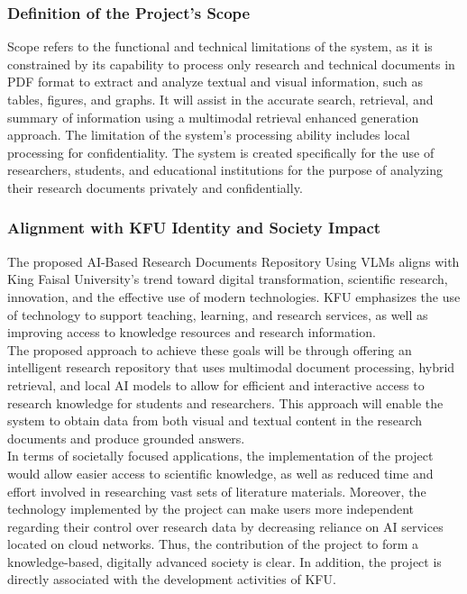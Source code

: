 \documentclass[11pt,a4paper]{report}
\begin{document}
\subsubsection{Definition of the Project's Scope}
Scope refers to the functional and technical limitations of the system, as it is constrained by its capability to process only research and technical documents in PDF format to extract and analyze textual and visual information, such as tables, figures, and graphs. It will assist in the accurate search, retrieval, and summary of information using a multimodal retrieval enhanced generation approach. The limitation of the system's processing ability includes local processing for confidentiality. The system is created specifically for the use of researchers, students, and educational institutions for the purpose of analyzing their research documents privately and confidentially.

\subsubsection{Alignment with KFU Identity and Society Impact}
The proposed AI-Based Research Documents Repository Using \acp{VLM} aligns with King Faisal University's trend toward digital transformation, scientific research, innovation, and the effective use of modern technologies. KFU emphasizes the use of technology to support teaching, learning, and research services, as well as improving access to knowledge resources and research information.\\

The proposed approach to achieve these goals will be through offering an intelligent research repository that uses multimodal document processing, hybrid retrieval, and local \ac{AI} models to allow for efficient and interactive access to research knowledge for students and researchers. This approach will enable the system to obtain data from both visual and textual content in the research documents and produce grounded answers.\\

In terms of societally focused applications, the implementation of the project would allow easier access to scientific knowledge, as well as reduced time and effort involved in researching vast sets of literature materials. Moreover, the technology implemented by the project can make users more independent regarding their control over research data by decreasing reliance on \ac{AI} services located on cloud networks. Thus, the contribution of the project to form a knowledge-based, digitally advanced society is clear. In addition, the project is directly associated with the development activities of KFU.
\end{document}
